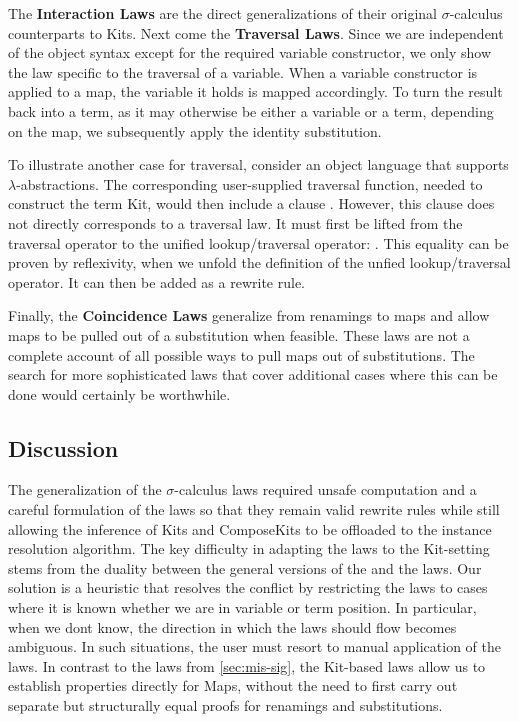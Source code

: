 \documentclass[screen,nonacm]{acmart}
\begin{document}
The \textbf{Interaction Laws} are the direct generalizations of their original
$\sigma$-calculus counterparts to Kits. Next come the \textbf{Traversal Laws}.
Since we are independent of the object syntax except for the required variable
constructor, we only show the law specific to the traversal of a variable. When
a variable constructor is applied to a map, the variable it holds is mapped
accordingly. To turn the result back into a term, as it may otherwise be either
a variable or a term, depending on the map, we subsequently apply the identity
substitution.

To illustrate another case for traversal, consider an object language that
supports $\lambda$-abstractions. The corresponding user-supplied traversal
function, needed to construct the term Kit, would then include a clause
\FSLambdaExT. However, this clause does not directly corresponds to a traversal
law. It must first be lifted from the traversal operator to the unified
lookup/traversal operator: \FSLambdaExL. This equality can be proven by
reflexivity, when we unfold the definition of the unfied lookup/traversal
operator. It can then be added as a rewrite rule.

Finally, the \textbf{Coincidence Laws} generalize from renamings to maps and
allow maps to be pulled out of a substitution when feasible. These laws are not
a complete account of all possible ways to pull maps out of substitutions. The
search for more sophisticated laws that cover additional cases where this can
be done would certainly be worthwhile.

\subsection{Discussion}
The generalization of the $\sigma$-calculus laws required unsafe computation
and a careful formulation of the laws so that they remain valid rewrite rules
while still allowing the inference of Kits and ComposeKits to be offloaded to
the instance resolution algorithm. The key difficulty in adapting the laws to
the Kit-setting stems from the duality between the general versions of the
 and the  laws. Our solution is
a heuristic that resolves the conflict by restricting the laws to cases where
it is known whether we are in variable or term position. In particular, when we
dont know, the direction in which the laws should flow becomes ambiguous. In
such situations, the user must resort to manual application of the laws. In
contrast to the laws from \cref{sec:mis-sig}, the Kit-based laws allow us to
establish properties directly for Maps, without the need to first carry out
separate but structurally equal proofs for renamings and substitutions.
\end{document}
